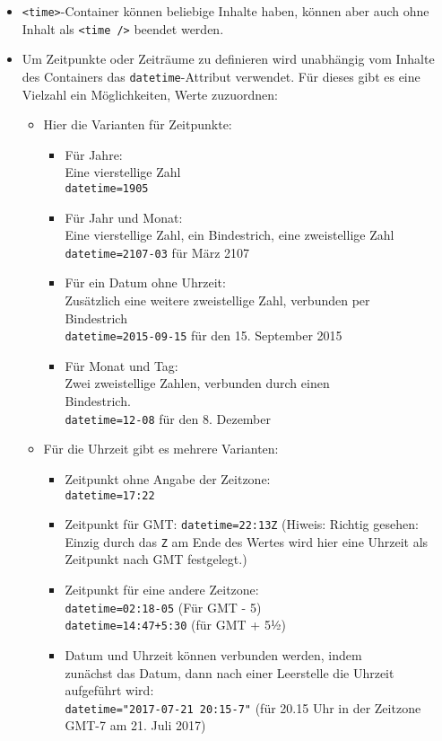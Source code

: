 \begin{itemize}
	\item \verb|<time>|-Container können beliebige Inhalte haben, können aber auch ohne Inhalt als \verb|<time />| beendet werden.
	\item Um Zeitpunkte oder Zeiträume zu definieren wird unabhängig vom Inhalte des Containers das \verb|datetime|-Attribut verwendet. Für dieses gibt es eine Vielzahl ein Möglichkeiten, Werte zuzuordnen:
	\begin{itemize}
		\item Hier die Varianten für Zeitpunkte:
		\begin{itemize}
			\item Für Jahre:\\
			Eine vierstellige Zahl\\
			\verb|datetime=1905|
			\item Für Jahr und Monat:\\
			Eine vierstellige Zahl, ein Bindestrich, eine zweistellige Zahl\\
			\verb|datetime=2107-03| für März 2107
			\item Für ein Datum ohne Uhrzeit:\\
			Zusätzlich eine weitere zweistellige Zahl, verbunden per \\Bindestrich\\
			\verb|datetime=2015-09-15| für den 15. September 2015
			\item Für Monat und Tag:\\
			Zwei zweistellige Zahlen, verbunden durch einen \\Bindestrich.\\
			\verb|datetime=12-08| für den 8. Dezember
		\end{itemize}
		\item Für die Uhrzeit gibt es mehrere Varianten:
		\begin{itemize}
			\item Zeitpunkt ohne Angabe der Zeitzone:\\
			\verb|datetime=17:22|
			\item Zeitpunkt für GMT:
			\verb|datetime=22:13Z| (Hiweis: Richtig gesehen: Einzig durch das \verb|Z| am Ende des Wertes wird hier eine Uhrzeit als Zeitpunkt nach GMT festgelegt.)
			\item Zeitpunkt für eine andere Zeitzone:\\
			\verb|datetime=02:18-05| (Für GMT - 5)\\
			\verb|datetime=14:47+5:30|	(für GMT + 5½)
			\item Datum und Uhrzeit können verbunden werden, indem \\zunächst das Datum, dann nach einer Leerstelle die Uhrzeit aufgeführt wird:\\
			\verb|datetime="2017-07-21 20:15-7"| (für 20.15 Uhr in der Zeitzone GMT-7 am 21. Juli 2017)
		\end{itemize}
	\end{itemize}
\end{itemize}

